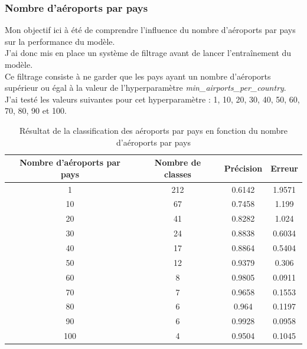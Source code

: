 \subsubsection{Nombre d'aéroports par pays}
Mon objectif ici à été de comprendre l'influence du nombre d'aéroports par pays
sur la performance du modèle.\\ J'ai donc mis en place un système de filtrage
avant de lancer l'entraînement du modèle.\\ Ce filtrage consiste à ne garder
que les pays ayant un nombre d'aéroports supérieur ou égal à la valeur de
l'hyperparamètre \textit{min\_airports\_per\_country}.\\ J'ai testé les valeurs
suivantes pour cet hyperparamètre : 1, 10, 20, 30, 40, 50, 60, 70, 80, 90 et
100.\\
\begin{table}[h!]
    \centering
    \begin{tabular}{|c|c||c|c|}
        \hline
        \textbf{Nombre d'aéroports par pays} & \textbf{Nombre de classes} & \textbf{Précision} & \textbf{Erreur} \\ \hline
        1                                    & 212                        & 0.6142             & 1.9571          \\ \hline
        10                                   & 67                         & 0.7458             & 1.199           \\ \hline
        20                                   & 41                         & 0.8282             & 1.024           \\ \hline
        30                                   & 24                         & 0.8838             & 0.6034          \\ \hline
        40                                   & 17                         & 0.8864             & 0.5404          \\ \hline
        50                                   & 12                         & 0.9379             & 0.306           \\ \hline
        60                                   & 8                          & 0.9805             & 0.0911          \\ \hline
        70                                   & 7                          & 0.9658             & 0.1553          \\ \hline
        80                                   & 6                          & 0.964              & 0.1197          \\ \hline
        90                                   & 6                          & 0.9928             & 0.0958          \\ \hline
        100                                  & 4                          & 0.9504             & 0.1045          \\ \hline
    \end{tabular}
    \caption{Résultat de la classification des aéroports par pays en fonction du nombre d'aéroports par pays}
\end{table}

